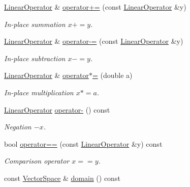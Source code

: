\begin{DoxyCompactItemize}
\item 
\hyperlink{classSpacy_1_1dealII_1_1LinearOperator}{Linear\-Operator} \& \hyperlink{classSpacy_1_1dealII_1_1LinearOperator_a09a7e00eafec152845c49c16806c7fd9}{operator+=} (const \hyperlink{classSpacy_1_1dealII_1_1LinearOperator}{Linear\-Operator} \&y)
\begin{DoxyCompactList}\small\item\em In-\/place summation $ x+=y$. \end{DoxyCompactList}\item 
\hyperlink{classSpacy_1_1dealII_1_1LinearOperator}{Linear\-Operator} \& \hyperlink{classSpacy_1_1dealII_1_1LinearOperator_a8475b17943c631f2d126be04b973c34f}{operator-\/=} (const \hyperlink{classSpacy_1_1dealII_1_1LinearOperator}{Linear\-Operator} \&y)
\begin{DoxyCompactList}\small\item\em In-\/place subtraction $ x-=y$. \end{DoxyCompactList}\item 
\hyperlink{classSpacy_1_1dealII_1_1LinearOperator}{Linear\-Operator} \& \hyperlink{classSpacy_1_1dealII_1_1LinearOperator_a60f68f1061039046f334504305cbd365}{operator$\ast$=} (double a)
\begin{DoxyCompactList}\small\item\em In-\/place multiplication $ x*=a$. \end{DoxyCompactList}\item 
\hyperlink{classSpacy_1_1dealII_1_1LinearOperator}{Linear\-Operator} \hyperlink{classSpacy_1_1dealII_1_1LinearOperator_a533f6b270f5efd1190a3d43ac94f6e64}{operator-\/} () const 
\begin{DoxyCompactList}\small\item\em Negation $ -x$. \end{DoxyCompactList}\item 
bool \hyperlink{classSpacy_1_1dealII_1_1LinearOperator_ab431c22b0e0e0e2834f929793eb389a2}{operator==} (const \hyperlink{classSpacy_1_1dealII_1_1LinearOperator}{Linear\-Operator} \&y) const 
\begin{DoxyCompactList}\small\item\em Comparison operator $ x==y$. \end{DoxyCompactList}\item 
\hypertarget{classSpacy_1_1OperatorBase_a2588f9b3e0188820c4c494e63293dc6f}{const \hyperlink{classSpacy_1_1VectorSpace}{Vector\-Space} \& \hyperlink{classSpacy_1_1OperatorBase_a2588f9b3e0188820c4c494e63293dc6f}{domain} () const }\label{classSpacy_1_1OperatorBase_a2588f9b3e0188820c4c494e63293dc6f}


\end{DoxyCompactItemize}
